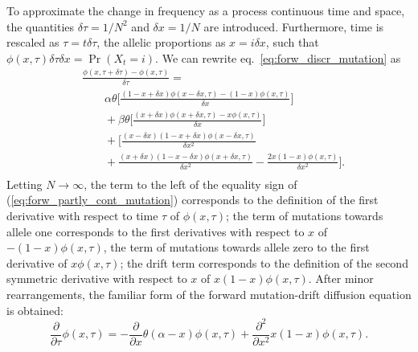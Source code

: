 \documentclass[preprint]{elsarticle}
\newcommand\x[1]{\ensuremath{X_{#1}}}
\begin{document}
{%

To approximate the change in frequency as a process continuous time and space, the quantities $\delta \tau=1/N^2$ and $\delta x=1/N$ are introduced. Furthermore, time is rescaled as $\tau = t\delta \tau$, the allelic proportions as $x=i\delta x$, such that $\phi(x,\tau)\delta \tau \delta x =
\Pr(\x{t}=i)$. %
We can rewrite eq.~\eqref{eq:forw_discr_mutation} as
\begin{equation}\label{eq:forw_partly_cont_mutation}
\begin{split}
&%
\frac{\phi(x,\tau+\delta \tau)-\phi(x,\tau)}{\delta \tau} =\\ 
&\qquad
\alpha\theta \bigg[\frac{(1-x+\delta x)\phi(x-\delta x, \tau) - (1-x)\phi(x,\tau)}{\delta x}\bigg]\\
&\qquad+\beta\theta \bigg[\frac{(x+\delta x)\phi(x+\delta x,\tau) - x\phi(x,\tau)}{\delta x}\bigg]\\
&\qquad+\bigg[\frac{(x-\delta x)(1-x+\delta x)\phi(x-\delta x,\tau)}{\delta x^2}\\
&\qquad+ \frac{(x+\delta x)(1-x-\delta x)\phi(x+\delta x,\tau)}{\delta x^2}-\frac{2x(1-x)\phi(x,\tau)}{\delta x^2}\bigg]
.\\
\end{split}
\end{equation}
Letting $N\to\infty$, the term to the left of the equality sign of (\ref{eq:forw_partly_cont_mutation}) corresponds to the definition of the first derivative with respect to time $\tau$ of $\phi(x,\tau)$; the term of mutations towards allele one corresponds to the first derivatives with respect to $x$ of $-(1-x)\phi(x,\tau)$, the term of mutations towards allele zero to the first derivative of $x\phi(x,\tau)$; the drift term corresponds to the definition of the second symmetric derivative with respect to $x$ of $x(1-x)\phi(x,\tau)$. After minor rearrangements, the familiar form of the forward mutation-drift diffusion equation is obtained:
\begin{equation}\label{eq:forw_mutdrift}
\frac{\partial}{\partial \tau} \phi(x,\tau) = -\frac{\partial}{\partial x}\theta(\alpha-x)\phi(x,\tau) +\frac{\partial^2}{\partial x^2}x(1-x)\phi(x,\tau).
\end{equation}

}
\end{document}
